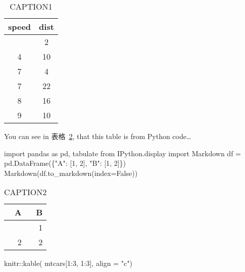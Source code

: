 \documentclass[
  1.2em,
  letterpaper,
]{scrbook}
\newenvironment{Shaded}{\begin{snugshade}}{\end{snugshade}}
\newcommand{\AttributeTok}[1]{\textcolor[rgb]{0.40,0.45,0.13}{#1}}
\newcommand{\DecValTok}[1]{\textcolor[rgb]{0.68,0.00,0.00}{#1}}
\newcommand{\FunctionTok}[1]{\textcolor[rgb]{0.28,0.35,0.67}{#1}}
\newcommand{\ImportTok}[1]{\textcolor[rgb]{0.00,0.46,0.62}{#1}}
\newcommand{\NormalTok}[1]{\textcolor[rgb]{0.00,0.23,0.31}{#1}}
\newcommand{\OperatorTok}[1]{\textcolor[rgb]{0.37,0.37,0.37}{#1}}
\newcommand{\SpecialCharTok}[1]{\textcolor[rgb]{0.37,0.37,0.37}{#1}}
\newcommand{\StringTok}[1]{\textcolor[rgb]{0.13,0.47,0.30}{#1}}
\newcommand{\VariableTok}[1]{\textcolor[rgb]{0.07,0.07,0.07}{#1}}
\begin{document}
\begin{longtable}[]{@{}cc@{}}

\caption{\label{tbl-LABEL1}CAPTION1}

\tabularnewline

\toprule\noalign{}
speed & dist \\
\midrule\noalign{}
\endhead
\bottomrule\noalign{}
\endlastfoot
4 & 2 \\
4 & 10 \\
7 & 4 \\
7 & 22 \\
8 & 16 \\
9 & 10 \\

\end{longtable}

You can see in 表格~\ref{tbl-LABEL2}, that this table is from Python
code\ldots{}

\begin{Shaded}
\begin{Highlighting}[]
\ImportTok{import}\NormalTok{ pandas }\ImportTok{as}\NormalTok{ pd, tabulate}
\ImportTok{from}\NormalTok{ IPython.display }\ImportTok{import}\NormalTok{ Markdown}
\NormalTok{df }\OperatorTok{=}\NormalTok{ pd.DataFrame(\{}\StringTok{"A"}\NormalTok{: [}\DecValTok{1}\NormalTok{, }\DecValTok{2}\NormalTok{], }
                   \StringTok{"B"}\NormalTok{: [}\DecValTok{1}\NormalTok{, }\DecValTok{2}\NormalTok{]\})}
\NormalTok{Markdown(df.to\_markdown(index}\OperatorTok{=}\VariableTok{False}\NormalTok{))}
\end{Highlighting}
\end{Shaded}

\begin{longtable}[]{@{}rr@{}}

\caption{\label{tbl-LABEL2}CAPTION2}

\tabularnewline

\toprule\noalign{}
A & B \\
\midrule\noalign{}
\endhead
\bottomrule\noalign{}
\endlastfoot
1 & 1 \\
2 & 2 \\

\end{longtable}

\begin{Shaded}
\begin{Highlighting}[]
\NormalTok{knitr}\SpecialCharTok{::}\FunctionTok{kable}\NormalTok{(}
\NormalTok{  mtcars[}\DecValTok{1}\SpecialCharTok{:}\DecValTok{3}\NormalTok{, }\DecValTok{1}\SpecialCharTok{:}\DecValTok{3}\NormalTok{], }\AttributeTok{align =} \StringTok{"c"}\NormalTok{)}
\end{Highlighting}
\end{Shaded}
\end{document}
